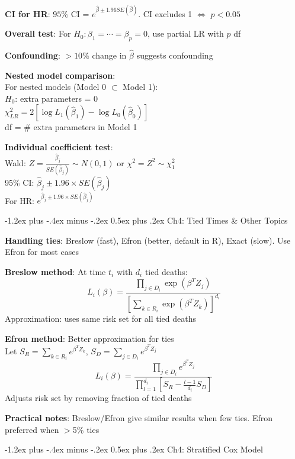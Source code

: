 ﻿\documentclass[10pt,letterpaper]{extarticle}
\makeatletter
\renewcommand{\section}{\@startsection{section}{1}{0mm}%
                                {-1.2ex plus -.4ex minus -.2ex}%
                                {0.5ex plus .2ex}%
                                {\normalfont\normalsize\bfseries}}
\newcommand{\h}[1]{\textbf{#1}}
\makeatother
\begin{document}
\begin{multicols}{3}
\h{CI for HR}: $95\%$ CI = $e^{\hat{\beta} \pm 1.96 SE(\hat{\beta})}$. CI excludes 1 $\Leftrightarrow$ $p<0.05$

\h{Overall test}: For $H_0: \beta_1 = \cdots = \beta_p = 0$, use partial LR with $p$ df

\h{Confounding}: $>10\%$ change in $\hat{\beta}$ suggests confounding

\h{Nested model comparison}: \\
For nested models (Model 0 $\subset$ Model 1): \\
$H_0$: extra parameters = 0 \\
$\chi^2_{LR} = 2[\log L_1(\hat{\beta}_1) - \log L_0(\hat{\beta}_0)]$ \\
df = \# extra parameters in Model 1

\h{Individual coefficient test}: \\
Wald: $Z = \frac{\hat{\beta}_j}{SE(\hat{\beta}_j)} \sim N(0,1)$ or $\chi^2 = Z^2 \sim \chi^2_1$ \\
95\% CI: $\hat{\beta}_j \pm 1.96 \times SE(\hat{\beta}_j)$ \\
For HR: $e^{\hat{\beta}_j \pm 1.96 \times SE(\hat{\beta}_j)}$

\section{Ch4: Tied Times \& Other Topics}

\h{Handling ties}: Breslow (fast), Efron (better, default in R), Exact (slow). Use Efron for most cases

\h{Breslow method}: At time $t_i$ with $d_i$ tied deaths: \\
$$L_i(\beta) = \frac{\prod_{j \in D_i} \exp(\beta^T Z_j)}{\left[\sum_{k \in R_i} \exp(\beta^T Z_k)\right]^{d_i}}$$
Approximation: uses same risk set for all tied deaths

\h{Efron method}: Better approximation for ties \\
Let $S_R = \sum_{k \in R_i} e^{\beta^T Z_k}$, $S_D = \sum_{j \in D_i} e^{\beta^T Z_j}$
$$L_i(\beta) = \frac{\prod_{j \in D_i} e^{\beta^T Z_j}}{\prod_{l=1}^{d_i} \left[S_R - \frac{l-1}{d_i}S_D\right]}$$
Adjusts risk set by removing fraction of tied deaths

\h{Practical notes}: Breslow/Efron give similar results when few ties. Efron preferred when $>$5\% ties

\section{Ch4: Stratified Cox Model}


\end{multicols}
\end{document}
